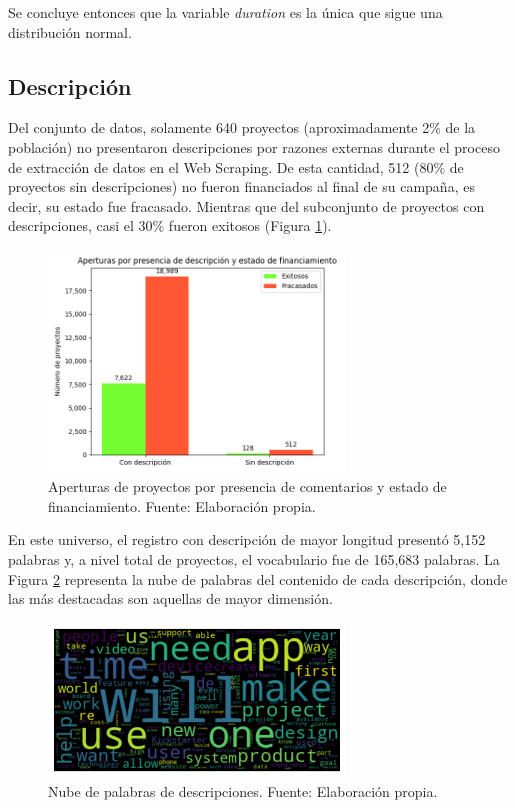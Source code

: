 Se concluye entonces que la variable \textit{duration} es la única que sigue una distribución normal.

\subsection{Descripción}
Del conjunto de datos, solamente 640 proyectos (aproximadamente 2\% de la población) no presentaron descripciones por razones externas durante el proceso de extracción de datos en el Web Scraping. De esta cantidad, 512 (80\% de proyectos sin descripciones) no fueron financiados al final de su campaña, es decir, su estado fue fracasado. Mientras que del subconjunto de proyectos con descripciones, casi el 30\% fueron exitosos (Figura \ref{4:fig24}).

\begin{figure}[!ht]
	\begin{center}
		\includegraphics[width=0.7\textwidth]{4/figures/projects description by state.png}
		\caption{Aperturas de proyectos por presencia de comentarios y estado de financiamiento. Fuente: Elaboración propia.}
		\label{4:fig24}
	\end{center}
\end{figure}

En este universo, el registro con descripción de mayor longitud presentó 5,152 palabras y, a nivel total de proyectos, el vocabulario fue de 165,683 palabras. La Figura \ref{4:fig25} representa la nube de palabras del contenido de cada descripción, donde las más destacadas son aquellas de mayor dimensión.

\begin{figure}[!ht]
	\begin{center}
		\includegraphics[width=0.7\textwidth]{4/figures/description_wordcloud_original_data.png}
		\caption{Nube de palabras de descripciones. Fuente: Elaboración propia.}
		\label{4:fig25}
	\end{center}
\end{figure}

